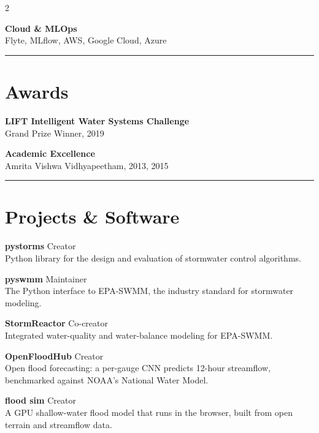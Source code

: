 \documentclass{article}
\newcommand{\divider}{\textcolor{tuftegray}{\rule{\linewidth}{0.5pt}}}
\begin{document}
\begin{paracol}{2}
\begin{flushleft}
\textbf{Cloud \& MLOps}\\
{\small Flyte, MLflow, AWS, Google Cloud, Azure}
\vspace{0.5em}
\divider
\vspace{0.5em}

\section{Awards}
\vspace{0.5em}
\textbf{LIFT Intelligent Water Systems Challenge}\\
{\small\textcolor{tuftegray}{Grand Prize Winner, 2019}}
\vspace{0.8em}

\textbf{Academic Excellence}\\
{\small\textcolor{tuftegray}{Amrita Vishwa Vidhyapeetham, 2013, 2015}}
\vspace{0.5em}
\divider
\vspace{0.5em}

\section{Projects \& Software}
\textbf{pystorms} \hfill \textcolor{tuftegray}{Creator}\\
{\small Python library for the design and evaluation of stormwater control algorithms.}
\vspace{0.5em}

\textbf{pyswmm} \hfill \textcolor{tuftegray}{Maintainer}\\
{\small The Python interface to EPA-SWMM, the industry standard for stormwater modeling.}
\vspace{0.5em}

\textbf{StormReactor} \hfill \textcolor{tuftegray}{Co-creator}\\
{\small Integrated water-quality and water-balance modeling for EPA-SWMM.}
\vspace{0.5em}

\textbf{OpenFloodHub} \hfill \textcolor{tuftegray}{Creator}\\
{\small Open flood forecasting: a per-gauge CNN predicts 12-hour streamflow, benchmarked against NOAA's National Water Model.}
\vspace{0.5em}

\textbf{flood sim} \hfill \textcolor{tuftegray}{Creator}\\
{\small A GPU shallow-water flood model that runs in the browser, built from open terrain and streamflow data.}




\end{flushleft}
\end{paracol}
\end{document}
